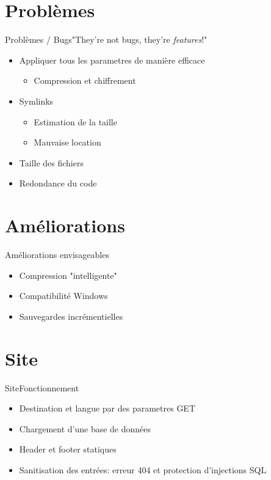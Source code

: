 \documentclass{beamer}
\begin{document}
	\section{Problèmes}
	\begin{frame}{Problèmes / Bugs}{"They're not bugs, they're \textit{features}!"}
		\begin{itemize}
			\item Appliquer tous les parametres de manière efficace
			\begin{itemize}
				\item Compression et chiffrement
			\end{itemize}
			\item Symlinks
			\begin{itemize}
				\item Estimation de la taille
				\item Mauvaise location
			\end{itemize}
			\item Taille des fichiers
			\item Redondance du code
		\end{itemize}
	\end{frame}

	\section{Améliorations}
	\begin{frame}{Améliorations envisageables}
		\begin{itemize}
			\item Compression "intelligente"
			\item Compatibilité Windows
			\item Sauvegardes incrémentielles
		\end{itemize}
	\end{frame}

	\section{Site}
	\begin{frame}{Site}{Fonctionnement}
		\begin{itemize}
			\item Destination et langue par des parametres GET
			\item Chargement d'une base de données
			\item Header et footer statiques
			\item Sanitisation des entrées: erreur 404 et protection d'injections SQL
		\end{itemize}
	\end{frame}
\end{document}
